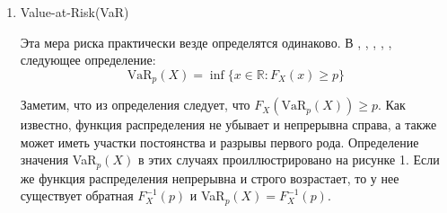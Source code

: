 \documentclass[12pt]{article}
\theoremstyle{plain}
\theoremstyle{definition}
\theoremstyle{remark}
\begin{document}
\begin{enumerate}
    \item Value-at-Risk(VaR)
    
    Эта мера риска практически везде определятся одинаково. В \cite{Denuit}, \cite{Desmedt}, \cite{Hardy}, \cite{Peng}, \cite{McNeil}, \cite{метка0} следующее определение:
    \[
        \text{VaR}_p(X) = \inf\{x\in\mathbb{R}: F_X(x) \geq p\}
    \]

    Заметим, что из определения следует, что $F_X(\text{VaR}_p(X)) \geq p$.
    Как известно, функция распределения не убывает и непрерывна справа, а также может иметь участки постоянства и разрывы первого рода. Определение значения  VaR$_p(X)$ в этих случаях проиллюстрировано на рисунке 1. Если же функция распределения непрерывна и строго возрастает, то у нее существует обратная $F^{-1}_X(p)$ и VaR$_p(X) = F^{-1}_X(p)$.

\begin{figure}[htp] %
    \centering %
\end{figure}
\end{enumerate}
\end{document}
